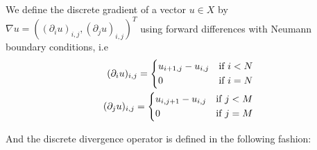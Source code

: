     \begin{definition} %
    \label{def:discrete_gradient_operator}

        We define the discrete gradient of a vector $u \in X$ by $\nabla u = ((\partial_{i}u)_{i, j}, (\partial_{j}u)_{i, j})^{T}$ using forward differences with Neumann boundary conditions, i.e
            \begin{eqnarray}
                (\partial_{i}u)_{i, j} =
                    \begin{dcases*}
                        u_{i+1, j} - u_{i, j} & \textnormal{if $i < N$}\\
                        0 & \textnormal{if $i = N$}
                    \end{dcases*}
                \label{eq:forward_partial_i} \\
                (\partial_{j}u)_{i, j} =
                    \begin{dcases*}
                        u_{i, j+1} - u_{i, j} & \textnormal{if $j < M$}\\
                        0 & \textnormal{if $j = M$}
                    \end{dcases*}
                \label{eq:forward_partial_j}
            \end{eqnarray}

    \end{definition}

    And the discrete divergence operator is defined in the following fashion:


